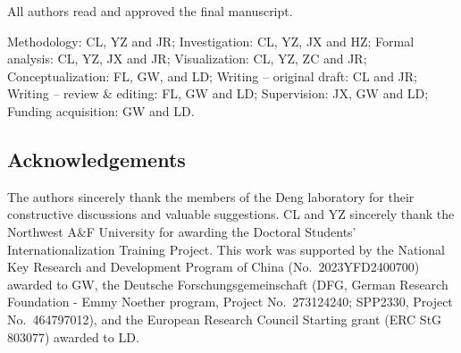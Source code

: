 All authors read and approved the final manuscript.

Methodology: CL, YZ and JR; Investigation: CL, YZ, JX and HZ; Formal
analysis: CL, YZ, JX and JR; Visualization: CL, YZ, ZC and JR;
Conceptualization: FL, GW, and LD; Writing -- original draft: CL and JR;
Writing -- review \& editing: FL, GW and LD; Supervision: JX, GW and LD;
Funding acquisition: GW and LD.

\subsection{Acknowledgements}\label{acknowledgements}

The authors sincerely thank the members of the Deng laboratory for their
constructive discussions and valuable suggestions. CL and YZ sincerely
thank the Northwest A\&F University for awarding the Doctoral Students'
Internationalization Training Project. This work was supported by the National Key Research and Development
Program of China (No.~2023YFD2400700) awarded to GW, the Deutsche
Forschungsgemeinschaft (DFG, German Research Foundation - Emmy Noether
program, Project No.~273124240; SPP2330, Project No.~464797012), and the
European Research Council Starting grant (ERC StG 803077) awarded to LD.


\renewcommand\refname{Reference}
